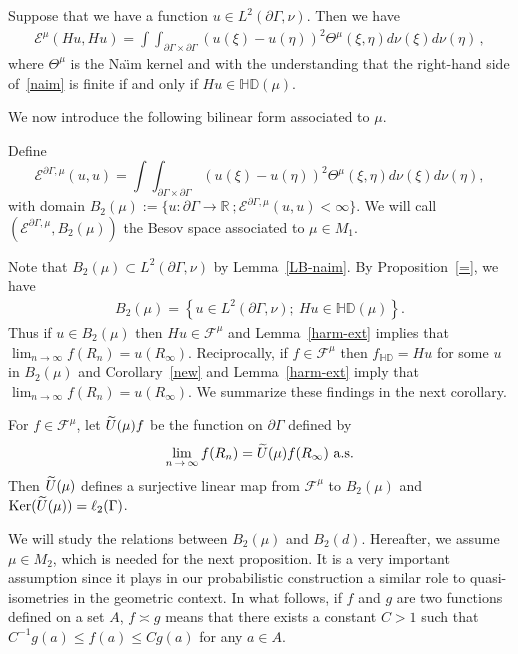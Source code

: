 \documentclass[AHL,Unicode,longabstracts,published]{cedram}
\newcommand{\ce}{\mathcal{E}}
\newcommand{\cf}{\mathcal{F}}
\newcommand{\br}{\mathbb{R}}
\newcommand{\bHD}{\mathbb{HD}}
\newcommand{\Ker}{\mathrm{Ker}}
\let\oldtilde\tilde
\renewcommand*{\tilde}[1]{\mathchoice{\widetilde{#1}}{\widetilde{#1}}{\oldtilde{#1}}{\oldtilde{#1}}}
\begin{document}
\begin{prop}\label{=}
Suppose that we have a function $u\in L^2(\partial\Gamma,\nu)$. Then we have
\begin{align}\label{naim}
\ce^\mu(Hu,Hu)=\int\int_{\partial\Gamma\times \partial\Gamma} (u(\xi)-u(\eta))^2\Theta^\mu(\xi,\eta) d\nu(\xi)d\nu(\eta)\,,
\end{align}
where $\Theta^\mu$ is the Na{\"\i}m kernel and with the understanding that the right-hand side of~\eqref{naim} is finite if and only if $Hu\in\bHD(\mu)$.
\end{prop}



We now introduce the following bilinear form associated to $\mu$.
\begin{defi}\label{emu}
Define
\[
\ce^{\partial\Gamma,\mu}(u,u)=\int\int_{\partial\Gamma\times \partial\Gamma}
(u(\xi)-u(\eta))^2 \Theta^\mu(\xi,\eta) d\nu(\xi)d\nu(\eta),
\]
with domain $B_2(\mu):=\{u:\partial \Gamma\rightarrow\br\ ;\ce^{\partial\Gamma,\mu}(u,u)<\infty\}$. We will call $(\ce^{\partial\Gamma,\mu},B_2(\mu))$ the Besov space associated to $\mu\in M_1$.
\end{defi}

Note that $B_2(\mu)\subset L^2(\partial\Gamma,\nu)$ by Lemma~\ref{LB-naim}. By Proposition~\ref{=}, we have
\begin{align}\label{besov=hu}
B_2(\mu)=\left\{u\in L^2(\partial\Gamma,\nu);\ Hu\in\bHD(\mu)\right\}.
\end{align}
Thus if $u\in B_2(\mu)$ then $Hu\in \cf^{\mu}$ and Lemma~\ref{harm-ext} implies that $\lim_{n\to\infty}f(R_n)=u(R_\infty)$. Reciprocally, if $f\in \cf^{\mu}$ then $f_{\bHD}=Hu$ for some $u$ in $B_2(\mu)$ and Corollary~\ref{new} and Lemma~\ref{harm-ext} imply that $\lim_{n\to\infty}f(R_n)=u(R_\infty)$. We summarize these findings in the next corollary.


\begin{coro}\label{new-new}
For $f\in\cf^{\mu}$, let $\tilde{U}(\mu)f$ be the function on $\partial\Gamma$ defined by
\[
\lim_{n\,\to\,\infty}f(R_n)=\tilde{U}(\mu)f(R_{\infty})\ \text{a.s.}
\]
Then $\tilde{U}(\mu)$ defines a surjective linear map from $\cf^{\mu}$ to $B_2(\mu)$ and $\Ker(\tilde{U}(\mu))=\ell_2(\Gamma)$.
\end{coro}


We will study the relations between $B_2(\mu)$ and $B_2(d)$. Hereafter, we assume $\mu\in M_2$, which is needed for the next proposition. It is a very important assumption since it plays in our probabilistic construction a similar role to quasi-isometries in the geometric context. In what follows, if $f$ and $g$ are two functions defined on a set $A$, $f\asymp g$ means that there exists a constant $C>1$ such that $C^{-1}g(a)\leq f(a)\leq Cg(a)$ for any $a\in A$.
\end{document}
